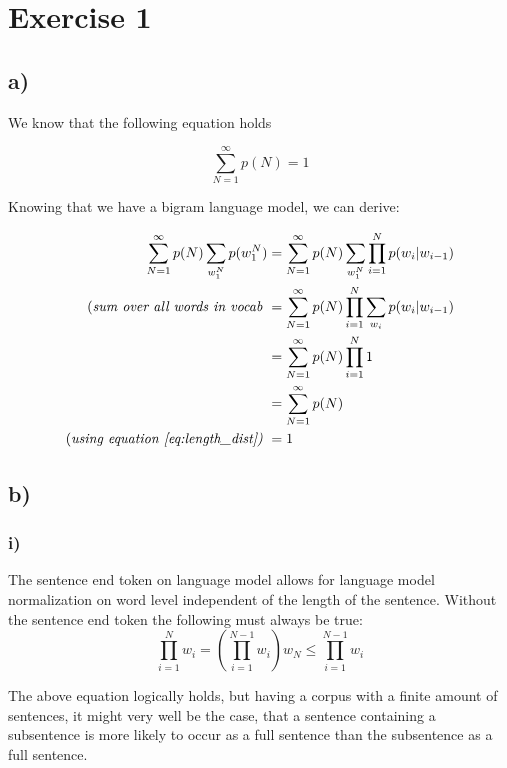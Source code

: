 \section*{Exercise 1} %
\label{sec:section_name}

\subsection*{a)} %
\label{sub:a}

We know that the following equation holds

\begin{equation} \label{eq:length_dist}
	\sum_{N=1}^{\infty} p(N) = 1
\end{equation}

Knowing that we have a bigram language model, we can derive: 

\begin{align*}
	\sum_{N=1}^{\infty} p(N) \sum_{w_1^{N}} p(w_1^{N}) &= \sum_{N=1}^{\infty} p(N) \sum_{w_1^{N}} \prod_{i = 1}^{N} p(w_i|w_{i-1}) \\ 
	\text{(\textit{sum over all words in vocab} }	&= \sum_{N=1}^{\infty} p(N) \prod_{i = 1}^{N} \sum_{w_i}  p(w_i|w_{i-1}) \\ 
	&= \sum_{N=1}^{\infty} p(N) \prod_{i = 1}^{N} 1 \\ 
	&= \sum_{N=1}^{\infty} p(N) \\ 
	\text{(\textit{using equation \ref{eq:length_dist})} }	&= 1 
\end{align*}

\subsection*{b)} %
\label{sub:b}

\subsubsection*{i)}%
\label{ssub:i_}

The sentence end token on language model allows for language model 
normalization on word level independent of the length of the sentence. 
Without the sentence end token the following must always be true: 
\[
	\prod_{i=1}^{N} w_i = (\prod_{i=1}^{N-1} w_i) w_N \le \prod_{i=1}^{N-1} w_i
\]

The above equation logically holds, but having a corpus with a finite 
amount of sentences, it might very well be the case, that a sentence containing 
a subsentence is more likely to occur as a full sentence than the subsentence 
as a full sentence. 

